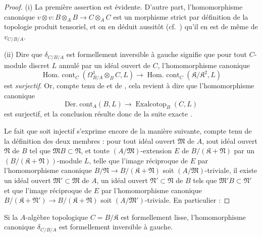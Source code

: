 \begin{proof}
(i) La première assertion est évidente. D'autre part, l'homomorphisme
canonique $v\otimes v:B\otimes_A B\to C\otimes_A C$ est un morphisme strict
par définition de la topologie produit tensoriel, et on en déduit aussitôt
(cf.\ ) qu'il en est de même de $v_{C/B/A}$.

(ii) Dire que $\delta_{C/B/A}$ est formellement inversible à gauche signifie
que pour tout $C$-module discret $L$ annulé par un idéal ouvert de $C$,
l'homomorphisme canonique
\[
  \operatorname{Hom.\ cont}_C(\Omega^1_{B/A}\otimes_B C,L)\to
  \operatorname{Hom.\ cont}_C(\mathfrak{K}/\mathfrak{K}^2,L)
\]
est \emph{surjectif}. Or, compte tenu de  et de
, cela revient à dire que l'homomorphisme canonique
\[
  \operatorname{D\acute{e}r.\ cont}_A(B,L)\to
  \operatorname{Exalcotop}_B(C,L)
\]
est surjectif, et la conclusion résulte donc de la suite exacte
.

Le fait que  soit injectif s'exprime encore de la manière
suivante, compte tenu de la définition des deux membres
 : pour tout idéal ouvert $\mathfrak{M}$ de $A$, {\i}out idéal
ouvert $\mathfrak{N}$ de $B$ tel que $\mathfrak{M}B\subset\mathfrak{N}$, et
toute $(A/\mathfrak{M})$-extension $E$ de
$B/(\mathfrak{K}+\mathfrak{N})$ par un
$(B/(\mathfrak{K}+\mathfrak{N}))$-module $L$, telle que l'image réciproque de
$E$ par l'homomorphisme canonique
$B/\mathfrak{N}\to B/(\mathfrak{K}+\mathfrak{N})$ soit
$(A/\mathfrak{M})$-triviale, il existe un idéal ouvert
$\mathfrak{M}'\subset\mathfrak{M}$ de $A$,
un idéal ouvert $\mathfrak{N}'\subset\mathfrak{N}$ de $B$ tels que
$\mathfrak{M}'B\subset\mathfrak{N}'$ et que l'image réciproque de $E$ par
l'homomorphisme canonique
$B/(\mathfrak{K}+\mathfrak{N}')\to B/(\mathfrak{K}+\mathfrak{N})$ soit
$(A/\mathfrak{M}')$-triviale. En particulier :
\end{proof}

\begin{corollary}[20.7.9]
\label{0.20.7.9-fr}
Si la $A$-algèbre topologique $C=B/\mathfrak{K}$ est formellement lisse,
l'homomorphisme canonique $\delta_{C/B/A}$ est formellement inversible à
gauche.
\end{corollary}

